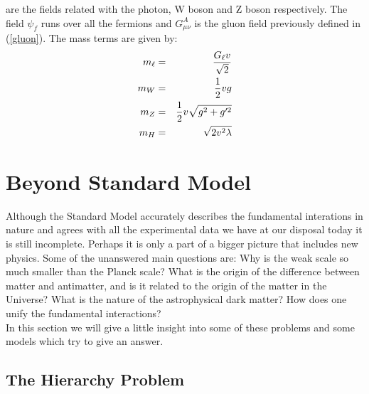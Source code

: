are the fields related with the photon, W boson and Z boson respectively. The field $\psi_{f}$ runs over all the fermions and   $G^{A}_{\mu\nu}$ is the gluon field previously defined in (\ref{gluon}). The mass terms are given by:
\begin{eqnarray}
m_{\ell} &=& \dfrac{G_{\ell} v}{\sqrt{2}}\\
m_{W} &=& \dfrac{1}{2} vg\\
m_{Z} &=& \dfrac{1}{2} v\sqrt{g^{2}+g'^{2}}\\
m_{H} &=& \sqrt{ 2 v^{2} \lambda}
\end{eqnarray}



\section{Beyond Standard Model}

Although the Standard Model accurately describes the fundamental interations in nature and agrees with all the experimental data we have at our disposal today it is still incomplete. Perhaps it is only a part of a bigger picture that includes new physics. Some of the unanswered main questions are:  Why is the weak scale so much smaller than the Planck scale?  What is the origin of the difference between matter and antimatter, and is it related to the origin of the matter in the Universe? What is the nature of the astrophysical dark matter? How does one unify the fundamental interactions?\\
\indent
In this section we will give a little insight into some of these problems and some models which try to give an answer.

\subsection{The Hierarchy Problem}\label{hierarchy}

